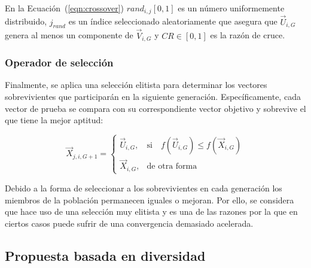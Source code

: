 En la Ecuación~(\ref{eqn:crossover}) $rand_{i,j}[0,1]$ es un número uniformemente distribuido, 
$j_{rand}$ es un índice seleccionado aleatoriamente que asegura que $\vec{U}_{i,G}$ genera al menos un componente 
de $\vec{V}_{i,G}$ y $CR \in [0,1]$ es la razón de cruce.

\subsubsection{Operador de selección}
Finalmente, se aplica una selección elitista para determinar los vectores sobrevivientes que participarán en la siguiente generación.
%
Específicamente, cada vector de prueba se compara con su correspondiente vector objetivo y sobrevive el que tiene la mejor aptitud:

\begin{equation} \label{eqn:selection}
\vec{X}_{j,i,G+1}= 
\begin{cases}
    \vec{U}_{i,G},& \text{si} \quad f(\vec{U}_{i,G}) \leq f(\vec{X}_{i,G})  \\
    \vec{X}_{i,G},              & \text{de otra forma}
\end{cases}
\end{equation}

Debido a la forma de seleccionar a los sobrevivientes en cada generación los miembros de la población permanecen iguales o mejoran.
%
Por ello, se considera que \DE{} hace uso de una selección muy elitista y es una de las razones por la que en ciertos casos puede
sufrir de una convergencia demasiado acelerada.

\subsection{Propuesta basada en diversidad}

